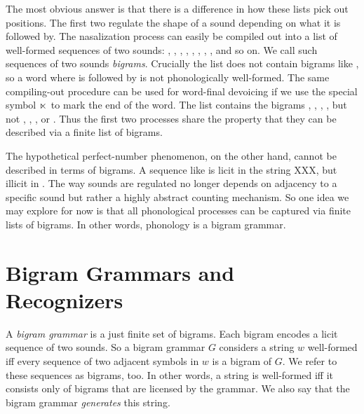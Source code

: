 The most obvious answer is that there is a difference in how these lists pick out positions.
The first two regulate the shape of a sound depending on what it is followed by.
The nasalization process can easily be compiled out into a list of well-formed sequences of two sounds: , , , , , , , , and so on.
We call such sequences of two sounds \emph{bigrams}.
Crucially the list does not contain bigrams like , so a word where  is followed by  is not phonologically well-formed.
The same compiling-out procedure can be used for word-final devoicing if we use the special symbol $\ltimes$ to mark the end of the word.
The list contains the bigrams , , , , but not , , , or .
Thus the first two processes share the property that they can be described via a finite list of bigrams.

The hypothetical perfect-number phenomenon, on the other hand, cannot be described in terms of bigrams.
A sequence like  is licit in the string XXX, but illicit in . %
The way sounds are regulated no longer depends on adjacency to a specific sound but rather a highly abstract counting mechanism.
So one idea we may explore for now is that all phonological processes can be captured via finite lists of bigrams.
In other words, phonology is a bigram grammar.

\section{Bigram Grammars and Recognizers}

A \emph{bigram grammar} is a just finite set of bigrams.
Each bigram encodes a licit sequence of two sounds.
So a bigram grammar $G$ considers a string $w$ well-formed iff every sequence of two adjacent symbols in $w$ is a bigram of $G$.
We refer to these sequences as bigrams, too.
In other words, a string is well-formed iff it consists only of bigrams that are licensed by the grammar.
We also say that the bigram grammar \emph{generates} this string.

